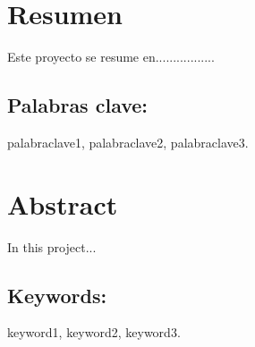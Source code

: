 \chapter{Resumen}

Este proyecto se resume en.................

\section*{Palabras clave:} palabraclave1, palabraclave2, palabraclave3.

\chapter{Abstract}

In this project...

\section*{Keywords:} keyword1, keyword2, keyword3.
